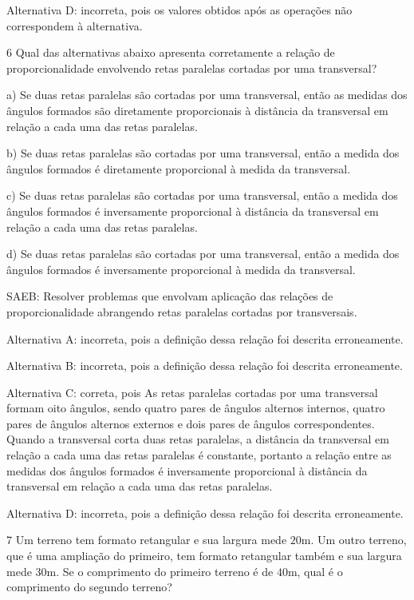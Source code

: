 Alternativa D: incorreta, pois os valores obtidos após as operações não
correspondem à alternativa.

\num{6}  Qual das alternativas abaixo apresenta corretamente a relação de
proporcionalidade envolvendo retas paralelas cortadas por uma
transversal?

a) Se duas retas paralelas são cortadas por uma transversal, então as
medidas dos ângulos formados são diretamente proporcionais à distância
da transversal em relação a cada uma das retas paralelas.

b) Se duas retas paralelas são cortadas por uma transversal, então a
medida dos ângulos formados é diretamente proporcional à medida da
transversal.

c) Se duas retas paralelas são cortadas por uma transversal, então a
medida dos ângulos formados é inversamente proporcional à distância da
transversal em relação a cada uma das retas paralelas.

d) Se duas retas paralelas são cortadas por uma transversal, então a
medida dos ângulos formados é inversamente proporcional à medida da
transversal.

SAEB: Resolver problemas que envolvam aplicação das relações de
proporcionalidade abrangendo retas paralelas cortadas por transversais.

Alternativa A: incorreta, pois a definição dessa relação foi descrita
erroneamente.

Alternativa B: incorreta, pois a definição dessa relação foi descrita
erroneamente.

Alternativa C: correta, pois As retas paralelas cortadas por uma
transversal formam oito ângulos, sendo quatro pares de ângulos alternos
internos, quatro pares de ângulos alternos externos e dois pares de
ângulos correspondentes. Quando a transversal corta duas retas
paralelas, a distância da transversal em relação a cada uma das retas
paralelas é constante, portanto a relação entre as medidas dos ângulos
formados é inversamente proporcional à distância da transversal em
relação a cada uma das retas paralelas.

Alternativa D: incorreta, pois a definição dessa relação foi descrita
erroneamente.

\num{7}  Um terreno tem formato retangular e sua largura mede $20$m. Um outro
terreno, que é uma ampliação do primeiro, tem formato retangular também
e sua largura mede $30$m. Se o comprimento do primeiro terreno é de $40$m,
qual é o comprimento do segundo terreno?

